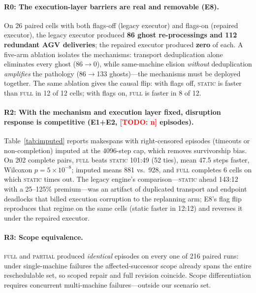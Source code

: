 \documentclass[twocolumn]{article}
\newcommand{\todo}[1]{\textcolor{red}{[TODO: #1]}}
\begin{document}
\paragraph{R0: The execution-layer barriers are real and removable
(E8).}
On 26 paired cells with both flags-off (legacy executor) and
flags-on (repaired executor), the legacy executor produced
\textbf{86 ghost re-processings and 112 redundant AGV deliveries};
the repaired executor produced \textbf{zero} of each. A five-arm
ablation isolates the mechanisms: transport deduplication alone
eliminates every ghost (86$\to$0), while same-machine elision
\emph{without} deduplication \emph{amplifies} the pathology
(86$\to$133 ghosts)---the mechanisms must be deployed together. The
same ablation gives the causal flip: with flags off,
\textsc{static} is faster than \textsc{full} in 12 of 12 cells; with
flags on, \textsc{full} is faster in 8 of 12.
\paragraph{R2: With the mechanism and execution layer fixed, disruption
response is competitive (E1+E2, \todo{n} episodes).}
Table~\ref{tab:imputed} reports makespans with right-censored episodes
(timeouts or non-completion) imputed at the 4096-step cap, which removes
survivorship bias. On 202 complete pairs, \textsc{full} beats
\textsc{static} 101:49 (52 ties), mean 47.5 steps faster, Wilcoxon
$p=5\times10^{-8}$; imputed means 881 vs.\ 928, and \textsc{full}
completes 6 cells on which \textsc{static} times out. The legacy
engine's comparison---\textsc{static} ahead 143:12 with a
25--125\% premium---was an artifact of duplicated transport and
endpoint deadlocks that billed execution corruption to the replanning
arm; E8's flag flip reproduces that regime on the same cells (static
faster in 12:12) and reverses it under the repaired executor.

\paragraph{R3: Scope equivalence.}
\textsc{full} and \textsc{partial} produced \emph{identical} episodes
on every one of 216 paired runs: under single-machine failures the
affected-successor scope already spans the entire reschedulable set, so
scoped repair and full revision coincide. Scope differentiation requires
concurrent multi-machine failures---outside our scenario set.
\end{document}

